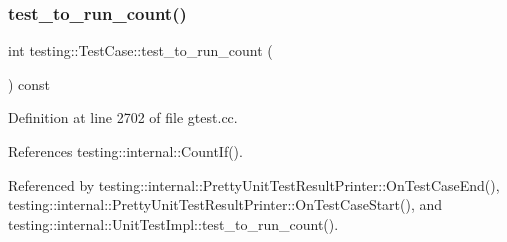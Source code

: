 \subsubsection{\texorpdfstring{test\+\_\+to\+\_\+run\+\_\+count()}{test\_to\_run\_count()}}
{\footnotesize\ttfamily int testing\+::\+Test\+Case\+::test\+\_\+to\+\_\+run\+\_\+count (\begin{DoxyParamCaption}{ }\end{DoxyParamCaption}) const}



Definition at line 2702 of file gtest.\+cc.



References testing\+::internal\+::\+Count\+If().



Referenced by testing\+::internal\+::\+Pretty\+Unit\+Test\+Result\+Printer\+::\+On\+Test\+Case\+End(), testing\+::internal\+::\+Pretty\+Unit\+Test\+Result\+Printer\+::\+On\+Test\+Case\+Start(), and testing\+::internal\+::\+Unit\+Test\+Impl\+::test\+\_\+to\+\_\+run\+\_\+count().


